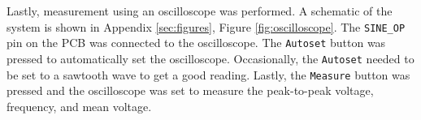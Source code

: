 Lastly, measurement using an oscilloscope was performed. A schematic of the system is shown in Appendix \ref{sec:figures}, Figure \ref{fig:oscilloscope}. 
The \texttt{SINE\_OP} pin on the PCB was connected to the oscilloscope.  The \texttt{Autoset} button was pressed to automatically set the oscilloscope. Occasionally,
the \texttt{Autoset} needed to be set to a sawtooth wave to get a good reading. Lastly, the \texttt{Measure} button was pressed and the oscilloscope was set to 
measure the peak-to-peak voltage, frequency, and mean voltage.




